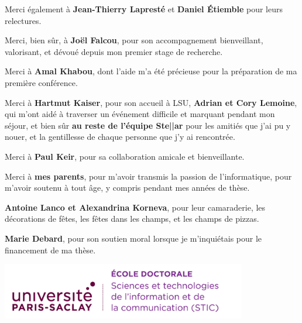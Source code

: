 \documentclass[english,12pt,a4paper]{book}
\begin{document}
Merci \'egalement \`a \textbf{Jean-Thierry Laprest\'e} et
\textbf{Daniel \'Etiemble} pour leurs relectures.

Merci, bien s\^ur, \`a \textbf{Jo\"el Falcou}, pour son accompagnement
bienveillant, valorisant, et d\'evou\'e depuis mon premier stage de recherche.


Merci \`a \textbf{Amal Khabou}, dont l'aide m'a \'et\'e pr\'ecieuse pour la pr\'eparation
de ma premi\`ere conf\'erence.

Merci \`a \textbf{Hartmut Kaiser}, pour son accueil \`a LSU,
\textbf{Adrian et Cory Lemoine}, qui m'ont aid\'e \`a
traverser un \'ev\'enement difficile et marquant pendant mon s\'ejour,
et bien s\^ur \textbf{au reste de l'\'equipe Ste||ar} pour les amiti\'es
que j'ai pu y nouer, et la gentillesse de chaque personne que j'y ai
rencontr\'ee.

Merci \`a \textbf{Paul Keir}, pour sa collaboration amicale et bienveillante.

Merci \`a \textbf{mes parents},
pour m'avoir transmis la passion de l'informatique,
pour m'avoir soutenu \`a tout \^age,
y compris pendant mes ann\'ees de th\`ese.


\textbf{Antoine Lanco et Alexandrina Korneva}, pour leur camaraderie, les
d\'ecorations de f\^etes, les f\^etes dans les champs, et les champs de pizzas.

\textbf{Marie Debard}, pour son soutien moral lorsque je m'inqui\'etais
pour le financement de ma th\`ese.

\thispagestyle{empty}

\noindent
\includegraphics[height=2.45cm]{ups/logo_STIC.png}
\vspace{1cm}

\small
\end{document}
